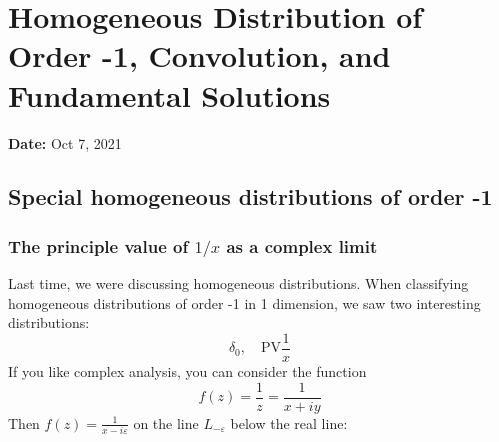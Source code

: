 
\newpage
\section{Homogeneous Distribution of Order -1, Convolution, and Fundamental Solutions}
\textbf{Date:} Oct 7, 2021
\subsection{Special homogeneous distributions of order -1}
\subsubsection{The principle value of $1/x$ as a complex limit}

Last time, we were discussing homogeneous distributions. When classifying homogeneous
distributions of order -1 in 1 dimension, we saw two interesting distributions:
$$
\delta_{0}, \quad \mathrm{PV} \frac{1}{x}
$$
If you like complex analysis, you can consider the function
$$
f(z)=\frac{1}{z}=\frac{1}{x+i y}
$$
Then $f(z)=\frac{1}{x-i \varepsilon}$ on the line $L_{-\varepsilon}$ below the real line:
\begin{figure}[H]
    \centering
\end{figure}

